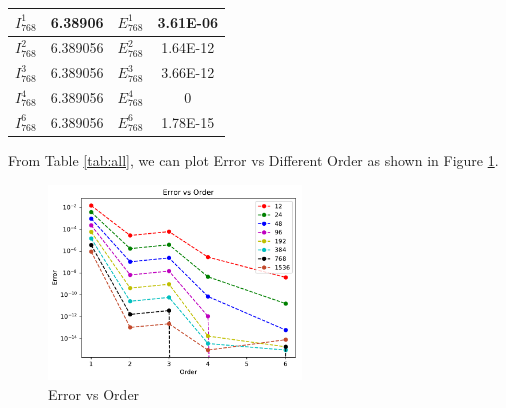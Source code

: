 \documentclass{article}
\begin{document}
\begin{table}[H]
{\begin{tabular}{|c|c|c|c|}
            \hline
            $I_{768}^1$ & 6.38906 & $E_{768}^1$ & 3.61E-06 \\ \hline
            $I_{768}^2$ & 6.389056 & $E_{768}^2$ & 1.64E-12 \\ \hline
            $I_{768}^3$ & 6.389056 & $E_{768}^3$ & 3.66E-12 \\ \hline
            $I_{768}^4$ & 6.389056 & $E_{768}^4$ & 0 \\ \hline
            $I_{768}^6$ & 6.389056 & $E_{768}^6$ & 1.78E-15 \\ \hline
        \end{tabular}
        \label{tab:768}
    }
\end{table}
From Table \ref{tab:all}, we can plot Error vs Different Order as shown in Figure \ref{fig:error_order}.
\begin{figure}[H]
    \centering
    \includegraphics[width=0.6\textwidth]{src/error.pdf}
    \caption{Error vs Order}
    \label{fig:error_order}
\end{figure}
\end{document}
